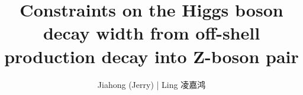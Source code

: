

\title{Constraints on the Higgs boson decay width from off-shell production decay into
Z-boson pair}

\author{Jiahong (Jerry) | Ling 凌嘉鸿}

   




